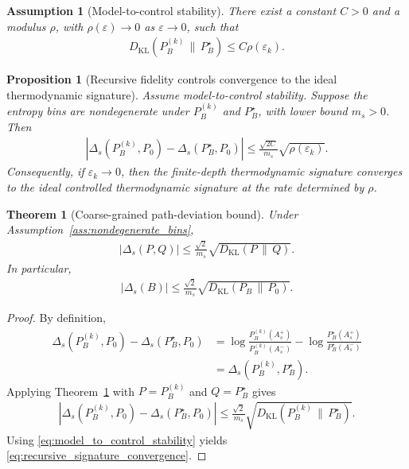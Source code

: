 \documentclass[10pt,a4paper]{amsart}
\newtheorem{assumption}{Assumption}
\newtheorem{theorem}{Theorem}
\newtheorem{proposition}{Proposition}
\def\EQSP{3pt}
\newcommand{\KL}{D_{\mathrm{KL}}}
\newcommand{\caligns}[2][\EQSP]{\begingroup\setlength\abovedisplayskip{#1}\setlength\belowdisplayskip{#1}\begin{align*} #2 \end{align*}\endgroup\noindent}
\newcommand{\cgather}[2][\EQSP]{\begingroup\setlength\abovedisplayskip{#1}\setlength\belowdisplayskip{#1}\begin{gather} #2 \end{gather}\endgroup\noindent}
\newcommand{\cgathers}[2][\EQSP]{\begingroup\setlength\abovedisplayskip{#1}\setlength\belowdisplayskip{#1}\begin{gather*} #2 \end{gather*}\endgroup\noindent}
\begin{document}
\begin{assumption}[Model-to-control stability]
\label{ass:model_to_control}
There exist a constant \(C>0\) and a modulus \(\rho\), with \(\rho(\varepsilon)\to0\) as \(\varepsilon\to0\), such that
\cgather{
    D_{\mathrm{KL}}
    \left(
    P_B^{(k)}\,\|\,P_B^\star
    \right)
    \leq
    C\rho(\varepsilon_k).
    \label{eq:model_to_control_stability}
}
\end{assumption}

\begin{proposition}[Recursive fidelity controls convergence to the ideal thermodynamic signature]
\label{prop:recursive_signature_convergence}
Assume model-to-control stability. Suppose the entropy bins are nondegenerate under \(P_B^{(k)}\) and \(P_B^\star\), with lower bound \(m_s>0\). Then
\cgather{
    \left|
    \Delta_s(P_B^{(k)},P_0)
    -
    \Delta_s(P_B^\star,P_0)
    \right|
    \leq
    \frac{\sqrt{2C}}{m_s}
    \sqrt{\rho(\varepsilon_k)}.
    \label{eq:recursive_signature_convergence}
}
Consequently, if \(\varepsilon_k\to0\), then the finite-depth thermodynamic signature converges to the ideal controlled thermodynamic signature at the rate determined by \(\rho\).
\end{proposition}

\begin{theorem}[Coarse-grained path-deviation bound]
\label{thm:path_deviation}
Under Assumption~\ref{ass:nondegenerate_bins},
\cgather{
    |\Delta_s(P,Q)|
    \leq
    \frac{\sqrt{2}}{m_s}
    \sqrt{\KL(P\,\|\,Q)}.
    \label{eq:path_deviation_bound}
}
In particular,
\cgather{
    |\Delta_s(B)|
    \leq
    \frac{\sqrt{2}}{m_s}
    \sqrt{\KL(P_B\,\|\,P_0)}.
    \label{eq:controlled_passive_deviation_bound}
}
\end{theorem}

\begin{proof}
By definition,
\caligns{
    \Delta_s(P_B^{(k)},P_0)
    -
    \Delta_s(P_B^\star,P_0)
    &=
    \log\frac{P_B^{(k)}(A_s^+)}{P_B^{(k)}(A_s^-)}
    -
    \log\frac{P_B^\star(A_s^+)}{P_B^\star(A_s^-)}\\
    &=
    \Delta_s(P_B^{(k)},P_B^\star).
}
Applying Theorem~\ref{thm:path_deviation} with \(P=P_B^{(k)}\) and \(Q=P_B^\star\) gives
\cgathers{
    \left|
    \Delta_s(P_B^{(k)},P_0)
    -
    \Delta_s(P_B^\star,P_0)
    \right|
    \leq
    \frac{\sqrt{2}}{m_s}
    \sqrt{\KL(P_B^{(k)}\,\|\,P_B^\star)}.}
Using \eqref{eq:model_to_control_stability} yields \eqref{eq:recursive_signature_convergence}.
\end{proof}
\end{document}
